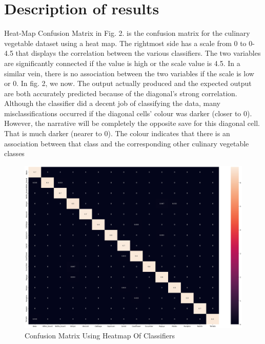 \documentclass[a4paper,fleqn]{cas-sc}
\begin{document}
\section{Description of results}
Heat-Map Confusion Matrix in Fig. 2. is the confusion matrix for the culinary vegetable dataset \cite{fernandez2017clustergrammer, soler2022data} using a heat map. The rightmost side has a scale from 0 to 0-4.5 that displays the correlation between the various classifiers. The two variables are significantly connected if the value is high or the scale value is 4.5. In a similar vein, there is no association between the two variables if the scale is low or 0. In fig. 2, we now. The output actually produced and the expected output are both accurately predicted because of the diagonal's strong correlation. Although the classifier did a decent job of classifying the data, many misclassifications occurred if the diagonal cells' colour was darker (closer to 0). However, the narrative will be completely the opposite save for this diagonal cell. That is much darker (nearer to 0). The colour indicates that there is an association between that class and the corresponding other culinary vegetable classes \cite{read2011classifier, read2009classifier}

\begin{figure}[!ht]
\includegraphics[scale=0.3]{correlation Matrics}
\caption{Confusion Matrix Using Heatmap Of Classifiers}
\label{}
\end{figure}
\end{document}
